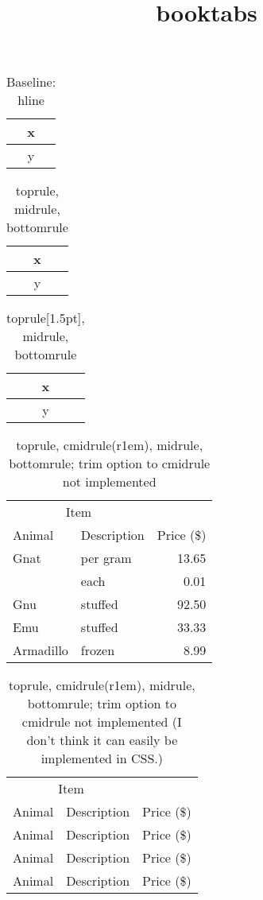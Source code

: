 \documentclass{amsbook}
\title{booktabs}
\begin{document}
\maketitle

\begin{table}[h]
\caption{Baseline: hline}
\begin{tabular}{c}
\hline
x\\
\hline
y\\
\hline
\end{tabular}
\end{table}

\begin{table}[h]
\caption{toprule, midrule, bottomrule}
\begin{tabular}{c}
\toprule
x\\
\midrule
y\\
\bottomrule
\end{tabular}
\end{table}

\begin{table}[h]
\caption{toprule[1.5pt], midrule, bottomrule}
\begin{tabular}{c}
\toprule[1.5pt]
x\\
\midrule
y\\
\bottomrule
\end{tabular}
\end{table}

\begin{table}[h]
\caption{toprule, cmidrule(r{1em}), midrule, bottomrule; trim option to
  cmidrule not implemented}
\begin{tabular}{@{}llr@{}}
\toprule
\multicolumn{2}{c}{Item} \\
\cmidrule(r{1em}){1-2}
Animal & Description & Price (\$)\\
\midrule
Gnat & per gram & 13.65 \\
& each
 & 0.01 \\
Gnu
 & stuffed
 & 92.50 \\
Emu
 & stuffed
 & 33.33 \\
Armadillo & frozen & 8.99 \\
\bottomrule
\end{tabular}
\end{table}

\begin{table}[h]
\caption{toprule, cmidrule(r{1em}), midrule, bottomrule; trim option to
  cmidrule not implemented (I don't think it can easily be implemented
in CSS.)}
\begin{tabular}{@{}llr@{}}
\toprule
\multicolumn{2}{c}{Item} \\
\cmidrule(r{1em}){1-2}
Animal & Description & Price (\$)\\
\cmidrule(r{1em}){0-1}
Animal & Description & Price (\$)\\
\cmidrule(r{1em}){0-2}
Animal & Description & Price (\$)\\
\cmidrule(r{1em}){1-3}
Animal & Description & Price (\$)\\
\end{tabular}
\end{table}
\end{document}
